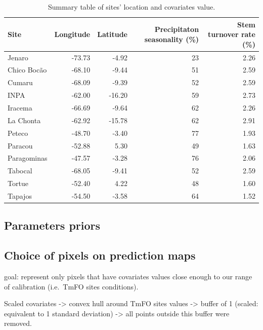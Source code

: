 \documentclass[]{elsarticle} %
\begin{document}
\begin{table}

\caption{\label{tab:unnamed-chunk-3}\label{tab:sites}Summary table of sites' location and covariates value.}
\centering
\begin{tabular}[t]{lrrrr}
\toprule
Site & Longitude & Latitude & Precipitaton seasonality (\%) & Stem turnover rate (\%)\\
\midrule
Jenaro & -73.73 & -4.92 & 23 & 2.26\\
Chico Bocão & -68.10 & -9.44 & 51 & 2.59\\
Cumaru & -68.09 & -9.39 & 52 & 2.59\\
INPA & -62.00 & -16.20 & 59 & 2.73\\
Iracema & -66.69 & -9.64 & 62 & 2.26\\
\addlinespace
La Chonta & -62.92 & -15.78 & 62 & 2.91\\
Peteco & -48.70 & -3.40 & 77 & 1.93\\
Paracou & -52.88 & 5.30 & 49 & 1.63\\
Paragominas & -47.57 & -3.28 & 76 & 2.06\\
Tabocal & -68.05 & -9.41 & 52 & 2.59\\
\addlinespace
Tortue & -52.40 & 4.22 & 48 & 1.60\\
Tapajos & -54.50 & -3.58 & 64 & 1.52\\
\bottomrule
\end{tabular}
\end{table}

\subsection{Parameters priors}\label{parameters-priors}

\subsection{Choice of pixels on prediction
maps}\label{choice-of-pixels-on-prediction-maps}

goal: represent only pixels that have covariates values close enough to
our range of calibration (i.e.~TmFO sites conditions).

Scaled covariates -\textgreater{} convex hull around TmFO sites values
-\textgreater{} buffer of 1 (scaled: equivalent to 1 standard deviation)
-\textgreater{} all points outside this buffer were removed.
\end{document}
